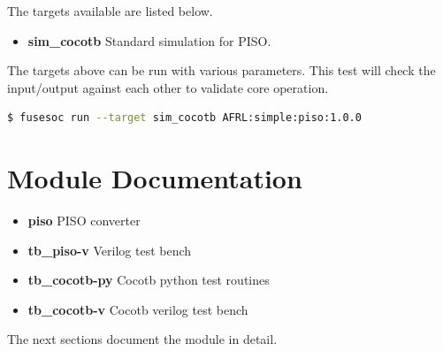The targets available are listed below.
\begin{itemize}
  \item \textbf{sim\_cocotb} Standard simulation for PISO.
\end{itemize}

The targets above can be run with various parameters.
This test will check the input/output against each other to validate core operation.
\begin{lstlisting}[language=bash]
  $ fusesoc run --target sim_cocotb AFRL:simple:piso:1.0.0
\end{lstlisting}

\newpage

\section{Module Documentation} \label{Module Documentation}

\par

\begin{itemize}
\item \textbf{piso} PISO converter\\
\item \textbf{tb\_piso-v} Verilog test bench\\
\item \textbf{tb\_cocotb-py} Cocotb python test routines\\
\item \textbf{tb\_cocotb-v} Cocotb verilog test bench\\
\end{itemize}
The next sections document the module in detail.

